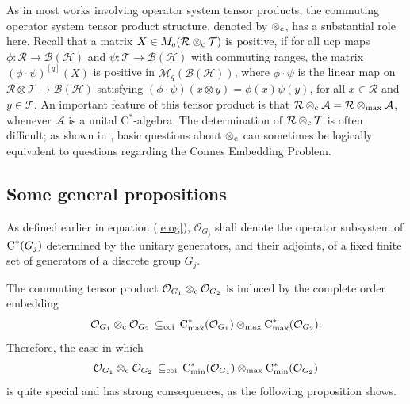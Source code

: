 \documentclass{amsart}
\theoremstyle{definition}
\theoremstyle{remark}
\newcommand{\B}{\mathcal{B}}
\renewcommand{\H}{\mathcal{H}}
\newcommand{\M}{\mathcal{M}}
\newcommand\osr{{\mathcal R}}
\newcommand\ost{{\mathcal T}}
\newcommand\omax{\otimes_{\textrm{max}}}
\newcommand\oc{\otimes_{\textrm c}}
\newcommand{\A}{\mathcal{A}}                    %
\newcommand\cstar{{\textrm C}^*}                              %
\numberwithin{equation}{section}
\begin{document}
As in most works involving operator system tensor products,
the commuting operator system tensor product structure, denoted by $\oc$,
has a substantial role here. Recall that a matrix $X\in M_q(\osr\oc\ost)$ is positive, if for all ucp maps
$\phi:\osr\rightarrow\B(\H)$ and $\psi:\ost\rightarrow\B(\H)$ with commuting ranges, the matrix $(\phi\cdot\psi)^{[q]}(X)$ is positive in 
$\M_q(\B(\H))$, where $\phi\cdot\psi$ is the linear map on $\osr\otimes\ost\rightarrow\B(\H)$ satisfying $(\phi\cdot\psi)(x\otimes y)=\phi(x)\psi(y)$, for all
$x\in\osr$ and $y\in\ost$.  An important feature of this tensor product is that $\osr\oc\A=\osr\omax\A$, whenever $\A$ is a unital C$^*$-algebra.
The determination of $\osr\oc\ost$ is often difficult; as shown in \cite{farenick--kavruk--paulsen--todorov2018,kavruk2014}, basic questions
about $\oc$ can sometimes be logically equivalent to questions regarding the Connes Embedding Problem.
 
 \subsection{Some general propositions}
 
 As defined earlier in equation (\ref{e:og}), 
 $\mathcal O_{G_j}$ shall denote the operator subsystem of $\cstar(G_j)$ determined by the unitary generators, and their adjoints, of a fixed finite
 set of generators of a discrete group $G_j$.
 
 The commuting tensor product $\mathcal O_{G_1}\otimes_{\textrm c}\mathcal O_{G_2}$ is induced by the complete
 order embedding 
 \[
 \mathcal O_{G_1}\otimes_{\textrm c}\mathcal O_{G_2} \,\subseteq_{\textrm{coi}}\,\cstar_{\textrm{max}}(\mathcal O_{G_1}) \omax \cstar_{\textrm{max}}(\mathcal O_{G_2}).
 \]
Therefore, the
case in which
\[
\mathcal O_{G_1}\otimes_{\textrm c}\mathcal O_{G_2} \,\subseteq_{\textrm{coi}}\,\cstar_{\textrm{min}}(\mathcal O_{G_1}) \omax \cstar_{\textrm{min}}(\mathcal O_{G_2}) 
\]
is quite special and has strong consequences, as the following proposition shows.
\end{document}
